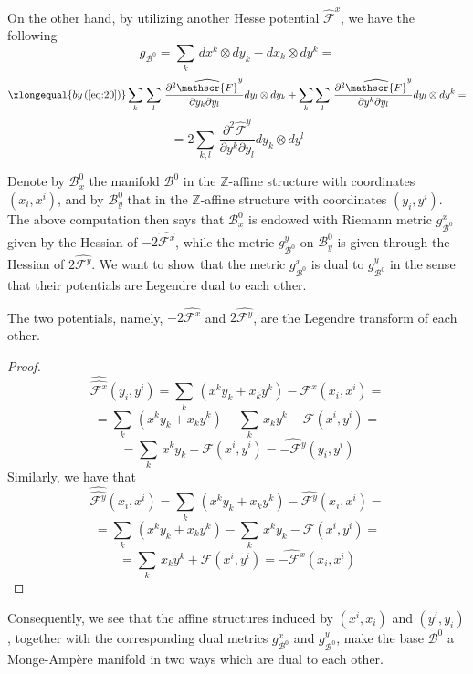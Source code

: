 \documentclass{article}
\begin{document}
On the other hand, by utilizing another Hesse potential $\widehat{\mathscr{F}}^{x}$, we have the following  
\[ g_{\mathcal{B}^{0}}=\sum_{k}\,dx^{k}\otimes dy_{k}-dx_{k}\otimes dy^{k}=\]
\begin{equation*}
        \xlongequal{by\,(\ref{eq:20})}\sum_{k}\,\sum_{l}\,\frac{\partial^{2}\widehat{\mathscr{F}}^{y}}{\partial y_{k}\partial y_{l}}dy_{l}\otimes dy_{k}+\sum_{k}\sum_{l}\,\frac{\partial^{2}\widehat{\mathscr{F}}^{y}}{\partial y^{k}\partial y_{l}}dy_{l}\otimes dy^{k}=
\end{equation*}
\begin{equation}
    =2\sum_{k,l}\,\frac{\partial^{2}\widehat{\mathscr{F}}^{y}}{\partial y^{k}\partial y_{l}}dy_{k}\otimes dy^{l}
\end{equation}

Denote by $\mathcal{B}^{0}_{x}$ the manifold $\mathcal{B}^{0}$ in the $\mathbb{Z}$-affine structure with coordinates $(x_{i},x^{i})$, and by $\mathcal{B}^{0}_{y}$ that in the $\mathbb{Z}$-affine structure with coordinates $(y_{i},y^{i})$. The above computation then says that $\mathcal{B}^{0}_{x}$ is endowed with Riemann metric $g_{\mathcal{B}^{0}}^{x}$ given by the Hessian of $-2\widehat{\mathscr{F}^{x}}$, while the metric $g_{\mathcal{B}^{0}}^{y}$ on $\mathcal{B}^{0}_{y}$ is given through the Hessian of $2\widehat{\mathscr{F}^{y}}$. We want to show that the metric $g_{\mathcal{B}^{0}}^{x}$ is dual to $g_{\mathcal{B}^{0}}^{y}$ in the sense that their potentials are Legendre dual to each other.

\begin{proposition}\label{pro:4.4}
The two potentials, namely,
$-2\widehat{\mathscr{F}^{x}}$ and $2\widehat{\mathscr{F}^{y}}$, are the Legendre transform of each other.
\end{proposition}
\begin{proof}
\[\widehat{\widehat{\mathscr{F}^{x}}}(y_{i},y^{i})=\sum_{k}\,\left(x^{k}y_{k}+x_{k}y^{k}\right)-\widehat{\mathscr{F}^{x}}(x_{i},x^{i})=\]\[=\sum_{k}\,\left(x^{k}y_{k}+x_{k}y^{k}\right)-\sum_{k}\,x_{k}y^{k}-\mathscr{F}(x^{i},y^{i})=\]
\[=\sum_{k}\,x^{k}y_{k}+\mathscr{F}(x^{i},y^{i})=\widehat{-\mathscr{F}^{y}}(y_{i},y^{i})\]
Similarly, we have that\[\widehat{\widehat{\mathscr{F}^{y}}}(x_{i},x^{i})=\sum_{k}\,\left(x^{k}y_{k}+x_{k}y^{k}\right)-\widehat{\mathscr{F}^{y}}(x_{i},x^{i})=\]\[
        =\sum_{k}\,\left(x^{k}y_{k}+x_{k}y^{k}\right)-\sum_{k}\,x^{k}y_{k}-\mathscr{F}(x^{i},y^{i})=\]\[=\sum_{k}\,x_{k}y^{k}+\mathscr{F}(x^{i},y^{i})=\widehat{-\mathscr{F}^{x}}(x_{i},x^{i})\]
\end{proof}
Consequently, we see that the affine structures induced by $(x^{i},x_{i})$ and $(y^{i},y_{i})$, together with the corresponding dual metrics $g_{\mathcal{B}^{0}}^{x}$ and $g_{\mathcal{B}^{0}}^{y}$, make the base $\mathcal{B}^{0}$ a Monge-Amp\`ere manifold in two ways which are dual to each other.
\end{document}

